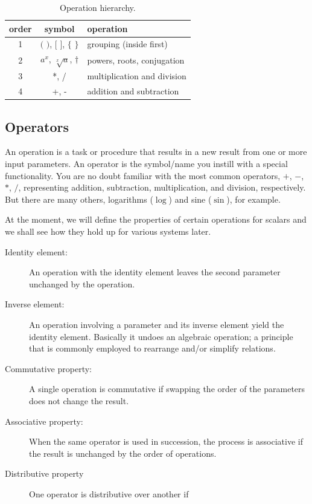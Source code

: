 \begin{table}[hbt]
    \centering
    \caption{Operation hierarchy.\vspace{2pt}}
    \label{tab-symbols}
    \begin{tabular}{ccl}
        \toprule
        order & symbol & operation \\
        \midrule
        1 & $($ $)$, $[$ $]$, $\{$ $\}$ & grouping (inside first) \\
        2 & $a^x$, $\sqrt[x]{a}$, $\dagger$ & powers, roots, conjugation \\
        3 & *, / & multiplication and division \\
        4 & +, - & addition and subtraction \\
        \bottomrule
    \end{tabular}
\end{table}


\subsection{Operators} \label{algebra:ops}

An operation is a task or procedure that results in a new result from one or
more input parameters.  An operator is the symbol/name you instill with a
special functionality.  You are no doubt familiar with the most common
operators, $+$, $-$, $*$, $/$, representing addition, subtraction,
multiplication, and division, respectively.  But there are many others,
logarithms ($\log$) and sine ($\sin$), for example.

At the moment, we will define the properties of certain operations for scalars
and we shall see how they hold up for various systems later.  
\begin{description}
    \item[Identity element:] An operation with the identity element leaves the
    second parameter unchanged by the operation.
    \item[Inverse element:] An operation involving a parameter and its inverse
    element yield the identity element.  Basically it undoes an algebraic
    operation; a principle that is commonly employed to rearrange and/or
    simplify relations.
    \item[Commutative property:] A single operation is commutative if swapping the
    order of the parameters does not change the result.
    \item[Associative property:] When the same operator is used in succession,
    the process is associative if the result is unchanged by the order of
    operations.
    \item[Distributive property] One operator is distributive over another if 
\end{description}

